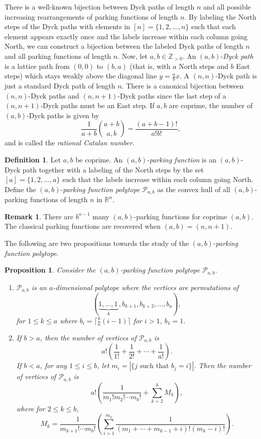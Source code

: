 \documentclass[11pt]{amsart}
\newtheorem{proposition}[theorem]{Proposition}
\theoremstyle{definition}
\newtheorem{remark}[theorem]{Remark}
\newtheorem{definition}[theorem]{Definition}
\newcommand{\0}{\emptyset}
\newcommand{\R}{\mathbb{R}}
\newcommand{\Z}{\mathbb{Z}}
\begin{document}
There is a well-known bijection between Dyck paths of length $n$ and all possible increasing rearrangements of parking functions of length $n$. 
By labeling the North steps of the Dyck paths with elements in $[n] = \{1,2,\dots, n\}$ such that each element appears exactly once and the labels increase within each column going North, we can construct a bijection between the labeled Dyck paths of length $n$ and all parking functions of length $n$.
Now, let $a,b \in \Z_{>0}$.
An $(a,b)$-\emph{Dyck path} is a lattice path from $(0,0)$ to $(b,a)$ (that is, with $a$ North steps and $b$ East steps) which stays weakly above the diagonal line $y = \frac{a}{b}x$. 
A $(n,n)$-Dyck path is just a standard Dyck path of length $n$. 
There is a canonical bijection between $(n,n)$-Dyck paths and $(n,n+1)$-Dyck paths since the last step of a $(n,n+1)$-Dyck paths must be an East step.
If $a,b$ are coprime, the number of $(a,b)$-Dyck paths is given by $$\frac{1}{a+b}\binom{a+b}{a,b} = \frac{(a+b-1)!}{a!b!},$$ and is called the \emph{rational Catalan number}.



\begin{definition}
Let $a,b$ be coprime.
An $(a,b)$-\emph{parking function} is an $(a,b)$-Dyck path together with a labeling of the North steps by the set $[a] = \{1,2,\dots, a\}$ such that the labels increase within each column going North. 
Define the $(a,b)$-\emph{parking function polytope} $\mathcal{P}_{a,b}$ as the convex hull of all $(a,b)$-parking functions of length $n$ in $\R^n$.
\end{definition}

\begin{remark}
There are $b^{a-1}$ many $(a,b)$-parking functions for coprime $(a,b)$.
The classical parking functions are recovered when $(a,b) = (n,n+1)$.
\end{remark}

The following are two propositions towards the study of the $(a,b)$-\emph{parking function polytope}. 

\begin{proposition}\label{prop:rational_vertices}
Consider the $(a,b)$-parking function polytope $\mathcal{P}_{a,b}$.
\begin{enumerate} 
    \item $\mathcal{P}_{a,b}$ is an $a$-dimensional polytope where the vertices are permutations of 
\[(\underbrace{1,\ldots, 1\,}_k, b_{k+1}, b_{k+2}, \ldots, b_a),\]
for $1 \leq k \leq a$ where $b_i = \lceil \frac{b}{a}(i-1)\rceil$ for $i>1$, $b_1 = 1$.

\item If $b>a$, then the number of vertices of  $\mathcal{P}_{a,b}$  is 
    \[a! \left(\frac{1}{1!} + \frac{1}{2!} + \cdots + \frac{1}{a!}\right).\]
 If $b<a$, for any $1\leq i\leq b$, let $m_i = | \{j \text{ such that } b_j = i\}|$.  Then the number of vertices of $\mathcal{P}_{a,b}$ is 
        \[a!  \left(\frac{1}{m_1!m_2!\cdots m_b!} + \sum\limits_{k=2}^b M_k\right),\]
where for $2\leq k \leq b$, $$M_k = \frac{1}{m_{k+1}!\cdots m_b!} \left(\sum\limits_{i=1}^{m_k} \frac{1}{(m_1+\cdots + m_{k-1} + i)! (m_k-i)!}\right).$$
\end{enumerate}   
\end{proposition}
\end{document}
